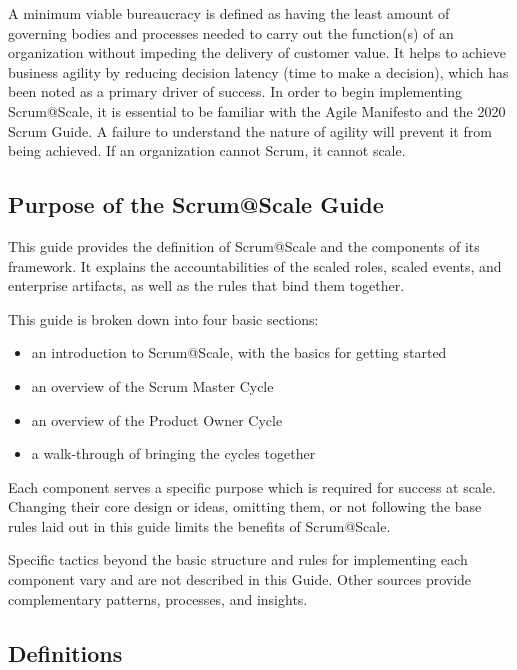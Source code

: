 \documentclass[12pt,a4paper,parskip=full]{scrartcl}
\begin{document}
A minimum viable bureaucracy is defined as having the least amount of governing bodies and processes needed to carry out the function(s) of an organization without impeding the delivery of customer value. It helps to achieve business agility by reducing decision latency (time to make a decision), which has been noted as a primary driver of success. In order to begin implementing Scrum@Scale, it is essential to be familiar with the Agile Manifesto and the 2020 Scrum Guide. A failure to understand the nature of agility will prevent it from being achieved. If an organization cannot Scrum, it cannot scale.


\subsection{Purpose of the Scrum@Scale
Guide}\label{purpose-of-the-ScrumatScale-guide}

This guide provides the definition of Scrum@Scale and the components of its framework. It explains the accountabilities of the scaled roles, scaled events, and enterprise artifacts, as well as the rules that bind them together.

This guide is broken down into four basic sections:

\begin{itemize}
\itemsep1pt\parskip0pt
\item
  an introduction to Scrum@Scale, with the basics for getting started
\item
  an overview of the Scrum Master Cycle
\item
  an overview of the Product Owner Cycle
\item
  a walk-through of bringing the cycles together
\end{itemize}

Each component serves a specific purpose which is required for success at scale. Changing their core design or ideas, omitting them, or not following the base rules laid out in this guide limits the benefits of Scrum@Scale.

Specific tactics beyond the basic structure and rules for implementing each component vary and are not described in this Guide. Other sources provide complementary patterns, processes, and insights.

\subsection{Definitions}\label{definitions}
\end{document}
